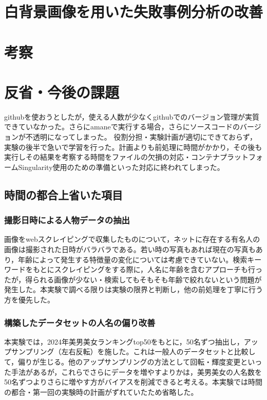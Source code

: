 \documentclass[a4paper,11pt,titlepage]{jsarticle}
\begin{document}
\section{白背景画像を用いた失敗事例分析の改善}




\section{考察}

\section{反省・今後の課題}
githubを使おうとしたが，使える人数が少なくgithubでのバージョン管理が実質できていなかった。さらにamaneで実行する場合，さらにソースコードのバージョンが不透明になってしまった。
役割分担・実験計画が適切にできておらず，実験の後半で急いで学習を行った。計画よりも前処理に時間がかかり，その後も実行しその結果を考察する時間をファイルの欠損の対応・コンテナプラットフォームSingularity使用のための準備といった対応に終われてしまった。

\subsection{時間の都合上省いた項目}
\subsubsection{撮影日時による人物データの抽出}
画像をwebスクレイピングで収集したものについて，ネットに存在する有名人の画像は撮影された日時がバラバラである。若い時の写真もあれば現在の写真もあり，年齢によって発生する特徴量の変化については考慮できていない。検索キーワードをもとにスクレイピングをする際に，人名に年齢を含むアプローチも行ったが，得られる画像が少ない・検索してもそもそも年齢で絞れないという問題が発生した。本実験で調べる限りは実験の限界と判断し，他の前処理を丁寧に行う方を優先した。

\subsubsection{構築したデータセットの人名の偏り改善}
本実験では，2024年美男美女ランキングtop50をもとに，50名ずつ抽出し，アップサンプリング（左右反転）を施した。これは一般人のデータセットと比較して，偏りが生じる。他のアップサンプリングの方法として回転・輝度変更といった手法があるが，これらでさらにデータを増やすよりかは，美男美女の人名数を50名ずつよりさらに増やす方がバイアスを削減できると考える。本実験では時間の都合・第一回の実験時の計画がずれていたため省略した。
\end{document}
